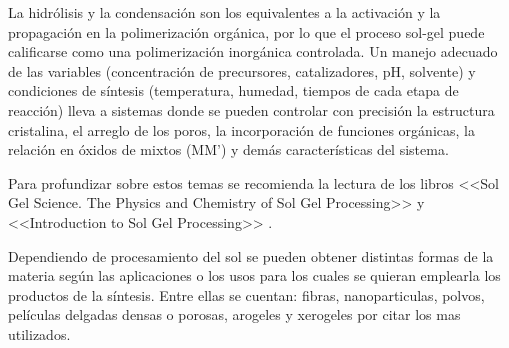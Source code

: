 	La hidrólisis y la condensación son los equivalentes a la activación y la propagación en la polimerización orgánica, por lo que el proceso sol-gel puede calificarse como una polimerización inorgánica controlada. Un manejo adecuado de las variables (concentración de precursores, catalizadores, pH, solvente) y condiciones de síntesis (temperatura, humedad, tiempos de cada etapa de reacción) lleva a sistemas donde se pueden controlar con precisión  la estructura cristalina, el arreglo de los poros, la incorporación de funciones orgánicas, la relación en óxidos de mixtos (MM') y demás características del sistema.

	Para profundizar sobre estos temas se recomienda la lectura de los libros <<Sol Gel Science. The Physics and Chemistry of Sol Gel Processing>>\cite{Wright2001} y <<Introduction to Sol Gel Processing>> \cite{Pierre1998}. 


	
	


	Dependiendo de procesamiento del sol se pueden obtener distintas formas de la materia según las aplicaciones o los usos para los cuales se quieran emplearla los productos de la síntesis. Entre ellas se cuentan: fibras, nanoparticulas, polvos, películas delgadas densas o porosas, arogeles y xerogeles por citar los mas utilizados.

	 	

